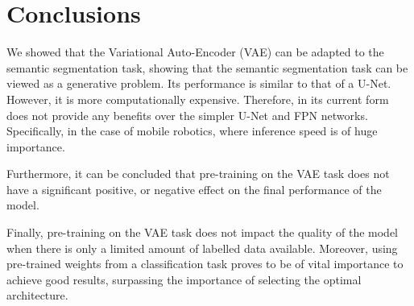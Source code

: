 \chapter{Conclusions}\label{chapter:conclusions}

We showed that the Variational Auto-Encoder (VAE) can be adapted to the semantic segmentation task, showing that the semantic segmentation task can be viewed as a generative problem. Its performance is similar to that of a U-Net. However, it is more computationally expensive. Therefore, in its current form does not provide any benefits over the simpler U-Net and FPN networks. Specifically, in the case of mobile robotics, where inference speed is of huge importance.

Furthermore, it can be concluded that pre-training on the VAE task does not have a significant positive, or negative effect on the final performance of the model. 

Finally, pre-training on the VAE task does not impact the quality of the model when there is only a limited amount of labelled data available. Moreover, using pre-trained weights from a classification task proves to be of vital importance to achieve good results, surpassing the importance of selecting the optimal architecture.
